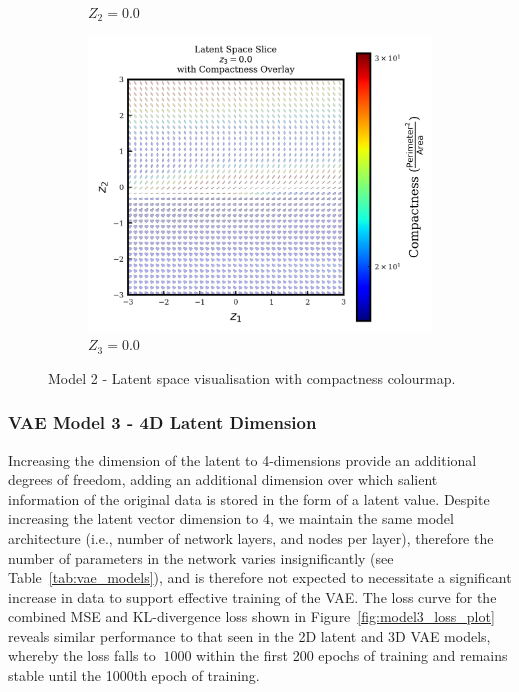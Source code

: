 \documentclass{article}
\begin{document}
\begin{figure}[H]
\begin{subfigure}{0.3\textwidth}
    \caption{$Z_2=0.0$}
    \label{fig:model2_fixz2_latent}
  \end{subfigure}
  \hfill
  \begin{subfigure}{0.3\textwidth}
    \centering
    \includegraphics[height=0.2\textheight]{figures/VAEmodels/model2/fix_z3_0.0.png}
    \caption{$Z_3=0.0$}
    \label{fig:model2_fixz3_latent}
  \end{subfigure}
  \caption{Model 2 - Latent space visualisation with compactness colourmap.}
  \label{fig:model2_latent_visualisations}
\end{figure}


\subsubsection{VAE Model 3 - 4D Latent Dimension}
Increasing the dimension of the latent to 4-dimensions provide an additional degrees of freedom, adding an additional dimension over which salient information of the original data is stored in the form of a latent value. Despite increasing the latent vector dimension to 4, we maintain the same model architecture (i.e., number of network layers, and nodes per layer), therefore the number of parameters in the network varies insignificantly (see Table~\ref{tab:vae_models}), and is therefore not expected to necessitate a significant increase in data to support effective training of the VAE. The loss curve for the combined MSE and KL-divergence loss shown in Figure~\ref{fig:model3_loss_plot} reveals similar performance to that seen in the 2D latent and 3D VAE models, whereby the loss falls to $~1000$ within the first 200 epochs of training and remains stable until the 1000th epoch of training.
\end{document}
